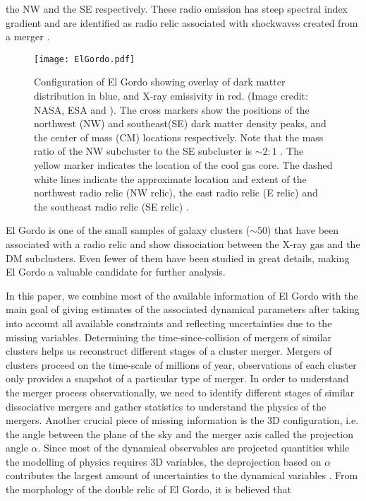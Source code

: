 the NW and the SE respectively. These radio emission has steep spectral
index gradient and are identified as radio relic associated with shockwaves
created from a merger \citep{L13}. 
\begin{figure}
	\texttt{[image: ElGordo.pdf]}
	\caption{Configuration of El Gordo showing overlay of dark
		matter distribution in blue, and X-ray emissivity in red. 
		(Image credit: NASA, ESA and \citealt{Jee13}). 
		The cross markers show the positions of the northwest (NW) and
		southeast(SE) dark matter density peaks, and the center of mass (CM)
		locations respectively. Note that the mass ratio of the NW subcluster
		to the SE subcluster is $\sim 2:1$ \citep{Jee13}. The yellow marker
		indicates the location of the cool gas core. 
		The dashed white lines indicate the approximate location and extent of the northwest radio relic (NW relic), the east radio relic (E relic) and the
		southeast radio relic (SE relic) \citep{L13}.
		\label{fig:config}}
\end{figure}
El Gordo is one of the small samples of galaxy clusters ($\sim50$) that have
been associated with a radio relic and show dissociation between the X-ray
gas and the DM subclusters. Even fewer of them have been studied in
great details, making El Gordo a valuable candidate for further analysis.\par 
In this paper, we combine most of the available information of El Gordo
with the main goal of giving estimates of
the associated dynamical parameters after taking into account all available
constraints and reflecting uncertainties due to the missing variables.
Determining the time-since-collision of mergers of similar clusters helps
us reconstruct different stages of a cluster merger.
Mergers of clusters proceed on the time-scale of millions of year,
observations of each cluster only provides a snapshot of a particular type
of merger. In order to understand the merger process observationally, 
we need to identify different stages of similar dissociative mergers and
gather statistics to understand the physics of the mergers.  
Another crucial piece of missing information is the 3D
configuration, i.e. the angle between the plane of the sky and the merger
axis called the projection angle $\alpha$. Since most of the dynamical
observables are projected quantities while the modelling of physics
requires 3D
variables, the deprojection based on $\alpha$ contributes the
largest amount of uncertainties to the dynamical variables .
From the morphology of the double relic of El Gordo, it is believed that
